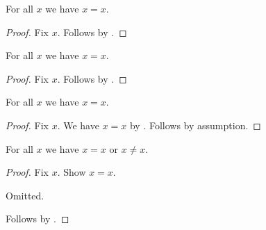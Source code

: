 

\begin{proposition}\label{phase5_from_source_axiom}
    For all $x$ we have $x = x$.
\end{proposition}
\begin{proof}
    Fix $x$.
    Follows by .
\end{proof}

\begin{proposition}\label{phase5_from_omitted_theorem}
    For all $x$ we have $x = x$.
\end{proposition}
\begin{proof}
    Fix $x$.
    Follows by .
\end{proof}

\begin{proposition}\label{phase5_source_axiom_through_local}
    For all $x$ we have $x = x$.
\end{proposition}
\begin{proof}
    Fix $x$.
    We have $x = x$ by .
    Follows by assumption.
\end{proof}

\begin{proposition}\label{phase5_omitted_with_checked_continuation}
    For all $x$ we have $x = x$ or $x \neq x$.
\end{proposition}
\begin{proof}
    Fix $x$.
    Show $x = x$.
    \begin{subproof}
        Omitted.
    \end{subproof}
    Follows by .
\end{proof}
